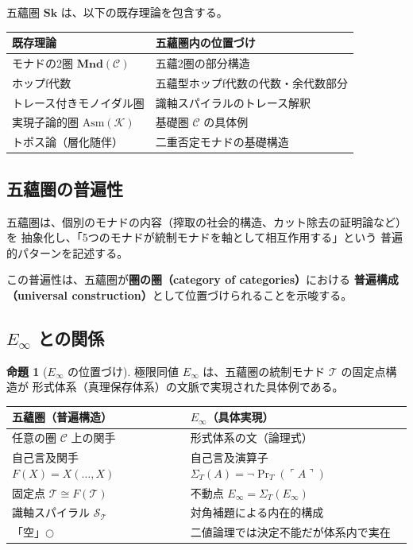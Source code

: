 \documentclass[11pt,a4paper]{article}
\theoremstyle{definition}
\newtheorem{proposition}{命題}[section]
\newcommand{\Sk}{\mathbf{Sk}}
\newcommand{\Asm}{\mathrm{Asm}}
\newcommand{\T}{\mathcal{T}}
\newcommand{\SpiralT}{\mathcal{S}_{\mathcal{T}}}
\newcommand{\Einf}{E_{\infty}}
\begin{document}
五蘊圏 $\Sk$ は、以下の既存理論を包含する。

\begin{center}
\begin{tabular}{ll}
\hline
\textbf{既存理論} & \textbf{五蘊圏内の位置づけ} \\
\hline
モナドの2圏 $\mathbf{Mnd}(\mathcal{C})$ & 五蘊2圏の部分構造 \\
ホップf代数 & 五蘊型ホップf代数の代数・余代数部分 \\
トレース付きモノイダル圏 & 識軸スパイラルのトレース解釈 \\
実現子論的圏 $\Asm(\mathcal{K})$ & 基礎圏 $\mathcal{C}$ の具体例 \\
トポス論（層化随伴） & 二重否定モナドの基礎構造 \\
\hline
\end{tabular}
\end{center}

\subsection{五蘊圏の普遍性}

五蘊圏は、個別のモナドの内容（搾取の社会的構造、カット除去の証明論など）を
抽象化し、「5つのモナドが統制モナドを軸として相互作用する」という
普遍的パターンを記述する。

この普遍性は、五蘊圏が\textbf{圏の圏（category of categories）}における
\textbf{普遍構成（universal construction）}として位置づけられることを示唆する。

\subsection{$E_{\infty}$ との関係}

\begin{proposition}[$\Einf$ の位置づけ]
極限同値 $\Einf$ は、五蘊圏の統制モナド $\T$ の固定点構造が
形式体系（真理保存体系）の文脈で実現された具体例である。

\begin{center}
\begin{tabular}{ll}
\hline
\textbf{五蘊圏（普遍構造）} & \textbf{$\Einf$（具体実現）} \\
\hline
任意の圏 $\mathcal{C}$ 上の関手 & 形式体系の文（論理式） \\
自己言及関手 $F(X) = X(\ldots, X)$ & 自己言及演算子 $\Sigma_T(A) = \neg\Pr_T(\ulcorner A \urcorner)$ \\
固定点 $\T \cong F(\T)$ & 不動点 $\Einf = \Sigma_T(\Einf)$ \\
識軸スパイラル $\SpiralT$ & 対角補題による内在的構成 \\
「空」$\bigcirc$ & 二値論理では決定不能だが体系内で実在 \\
\hline
\end{tabular}
\end{center}
\end{proposition}
\end{document}
